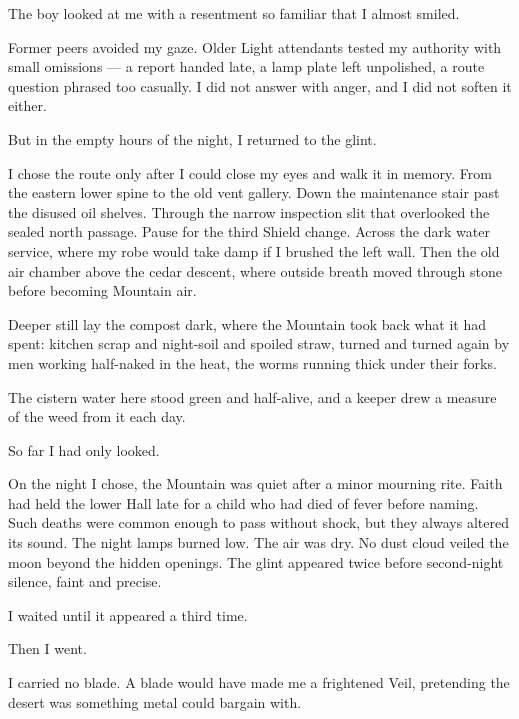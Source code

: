 The boy looked at me with a resentment so familiar that I almost smiled.\par

Former peers avoided my gaze. Older Light attendants tested my authority with small omissions --- a report handed late, a lamp plate left unpolished, a route question phrased too casually. I did not answer with anger, and I did not soften it either.\par

But in the empty hours of the night, I returned to the glint.\par

I chose the route only after I could close my eyes and walk it in memory. From the eastern lower spine to the old vent gallery. Down the maintenance stair past the disused oil shelves. Through the narrow inspection slit that overlooked the sealed north passage. Pause for the third Shield change. Across the dark water service, where my robe would take damp if I brushed the left wall. Then the old air chamber above the cedar descent, where outside breath moved through stone before becoming Mountain air.\par

Deeper still lay the compost dark, where the Mountain took back what it had spent: kitchen scrap and night-soil and spoiled straw, turned and turned again by men working half-naked in the heat, the worms running thick under their forks.\par

The cistern water here stood green and half-alive, and a keeper drew a measure of the weed from it each day.\par

So far I had only looked.\par

On the night I chose, the Mountain was quiet after a minor mourning rite. Faith had held the lower Hall late for a child who had died of fever before naming. Such deaths were common enough to pass without shock, but they always altered its sound. The night lamps burned low. The air was dry. No dust cloud veiled the moon beyond the hidden openings. The glint appeared twice before second-night silence, faint and precise.\par

I waited until it appeared a third time.\par

Then I went.\par

I carried no blade. A blade would have made me a frightened Veil, pretending the desert was something metal could bargain with.\par


